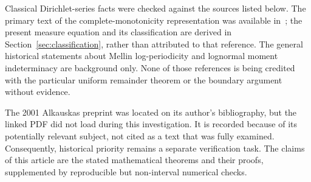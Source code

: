 \documentclass[11pt,letterpaper]{article}
\numberwithin{equation}{section}
\theoremstyle{definition}
\theoremstyle{remark}
\begin{document}
Classical Dirichlet-series facts were checked against the sources listed
below. The primary text of the complete-monotonicity representation was
available in~\cite{AJ}; the present measure equation and its classification
are derived in Section~\ref{sec:classification}, rather than attributed to
that reference. The general historical statements about Mellin
log-periodicity and lognormal moment indeterminacy are background only.
None of those references is being credited with the particular uniform
remainder theorem or the boundary argument without evidence.

The 2001 Alkauskas preprint was located on its author's bibliography, but
the linked PDF did not load during this investigation. It is recorded
because of its potentially relevant subject, not cited as a text that was
fully examined. Consequently, historical priority remains a separate
verification task. The claims of this article are the stated mathematical
theorems and their proofs, supplemented by reproducible but non-interval
numerical checks.
\end{document}

